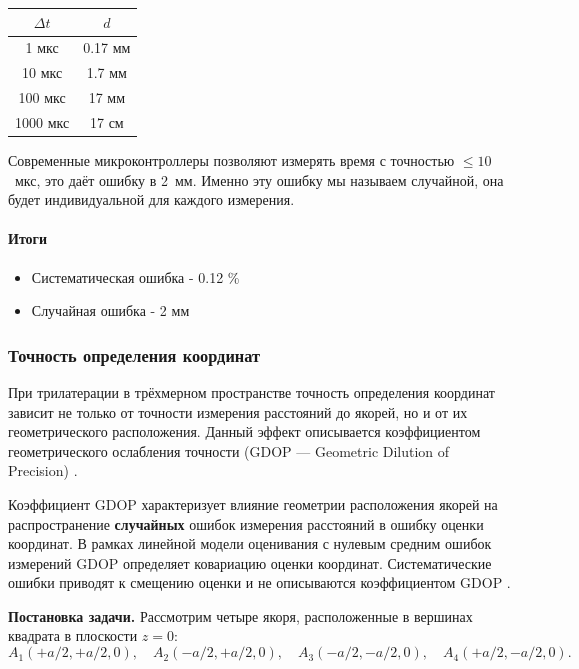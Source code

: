 \documentclass[a4paper,11pt]{article} %
\begin{document}
\begin{table}[h!]
    \centering
    \begin{tabular}{|c|c|}
        \hline
        $\Delta t$ & $d$ \\
        \hline
        1 мкс & 0.17 мм  \\
        10 мкс & 1.7 мм \\
        100 мкс & 17 мм \\
        1000 мкс & 17 см \\
        \hline
    \end{tabular}
    \label{tab:example}
\end{table}
Современные микроконтроллеры позволяют измерять время с точностью $\leq 10$~мкс, это даёт ошибку в 2~мм.
Именно эту ошибку мы называем случайной, она будет индивидуальной для каждого измерения.

\paragraph{Итоги\\}
\begin{itemize}
  \item Систематическая ошибка - 0.12 \%
  \item Случайная ошибка       -    2 мм
\end{itemize}


\subsubsection{Точность определения координат}

При трилатерации в трёхмерном пространстве точность определения координат зависит не только от точности измерения расстояний до якорей, но и от их геометрического расположения. Данный эффект описывается коэффициентом геометрического ослабления точности (GDOP — Geometric Dilution of Precision) \cite{kaplan2005,misra2006}.

Коэффициент GDOP характеризует влияние геометрии расположения якорей на распространение \textbf{случайных} ошибок измерения расстояний в ошибку оценки координат. В рамках линейной модели оценивания с нулевым средним ошибок измерений GDOP определяет ковариацию оценки координат. Систематические ошибки приводят к смещению оценки и не описываются коэффициентом GDOP \cite{kay1993,hayes1996}.

\textbf{Постановка задачи.} Рассмотрим четыре якоря, расположенные в вершинах квадрата в плоскости $z=0$:
$$
A_1(+a/2, +a/2, 0), \quad A_2(-a/2, +a/2, 0), \quad A_3(-a/2, -a/2, 0), \quad A_4(+a/2, -a/2, 0).
$$
\end{document}
